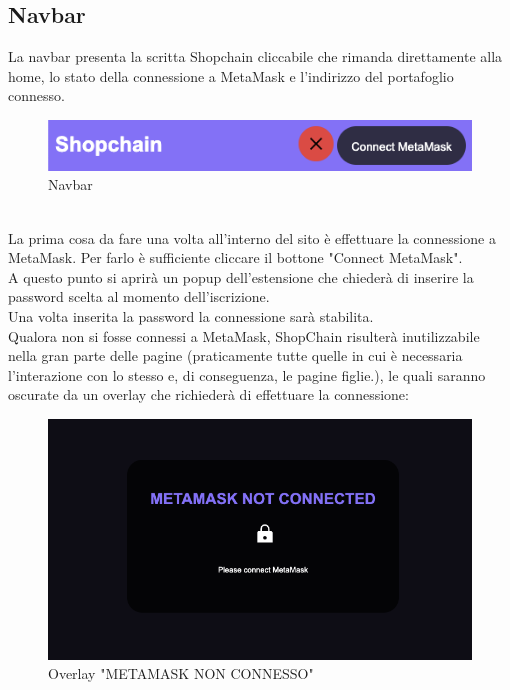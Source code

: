     \subsection{Navbar} \label{subsection:Navbar}
    La navbar presenta la scritta Shopchain cliccabile che rimanda direttamente alla home, lo stato della connessione a MetaMask e l'indirizzo del portafoglio connesso.
    \begin{figure}[H]
        \centering
        \includegraphics[scale=0.5]{immagini/navbar.png}
        \caption{Navbar}
    \end{figure}
    \textbf{}\\
    La prima cosa da fare una volta all'interno del sito è effettuare la connessione a MetaMask. Per farlo è sufficiente cliccare il bottone "Connect MetaMask".\\
    A questo punto si aprirà un popup dell'estensione che chiederà di inserire la password scelta al momento dell'iscrizione.\\
    Una volta inserita la password la connessione sarà stabilita.\\
    Qualora non si fosse connessi a MetaMask, ShopChain risulterà inutilizzabile nella gran parte delle pagine (praticamente tutte quelle in cui è necessaria l'interazione con lo stesso e, di conseguenza, le pagine figlie.), le quali saranno oscurate da un overlay che richiederà di effettuare la connessione:
    \begin{figure}[H]
        \centering
        \includegraphics[scale=0.4]{immagini/MetaMaskLayer.png}
        \caption{Overlay "METAMASK NON CONNESSO"}
    \end{figure}
